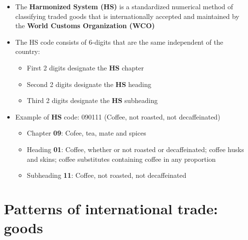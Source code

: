 \documentclass[
  ignorenonframetext,
]{beamer}
\providecommand{\tightlist}{%
  \setlength{\itemsep}{0pt}\setlength{\parskip}{0pt}}\usepackage{longtable,booktabs,array}
\begin{document}
\begin{frame}{}
\label{section-5}
\begin{itemize}
\item
  The \textbf{Harmonized System (HS)} is a standardized numerical method
  of classifying traded goods that is internationally accepted and
  maintained by the \textbf{World Customs Organization (WCO)}
\item
  The HS code consists of 6-digits that are the same independent of the
  country:

  \begin{itemize}
  \tightlist
  \item
    First 2 digits designate the \textbf{HS} chapter
  \item
    Second 2 digits designate the \textbf{HS} heading
  \item
    Third 2 digits designate the \textbf{HS} subheading
  \end{itemize}
\item
  Example of \textbf{HS} code: 090111 (Coffee, not roasted, not
  decaffeinated)

  \begin{itemize}
  \tightlist
  \item
    Chapter \textbf{09}: Cofee, tea, mate and spices
  \item
    Heading \textbf{01}: Coffee, whether or not roasted or
    decaffeinated; coffee husks and skins; coffee substitutes containing
    coffee in any proportion
  \item
    Subheading \textbf{11}: Coffee, not roasted, not decaffeinated
  \end{itemize}
\end{itemize}
\end{frame}

\section{Patterns of international trade:
goods}\label{patterns-of-international-trade-goods}
\end{document}
